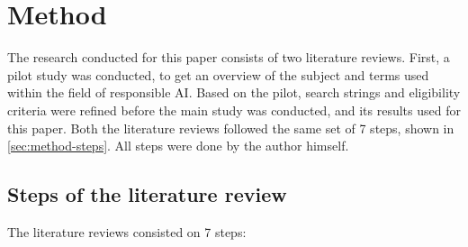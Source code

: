 \section{Method}
\label{sec:Method}


The research conducted for this paper consists of two literature reviews. First, a pilot study was conducted, to get an overview of the subject and terms used within the field of responsible AI. Based on the pilot, search strings and eligibility criteria were refined before the main study was conducted, and its results used for this paper. Both the literature reviews followed the same set of 7 steps, shown in \autoref{sec:method-steps}. All steps were done by the author himself.

\subsection{Steps of the literature review}
\label{sec:method-steps}
The literature reviews consisted on 7 steps:

